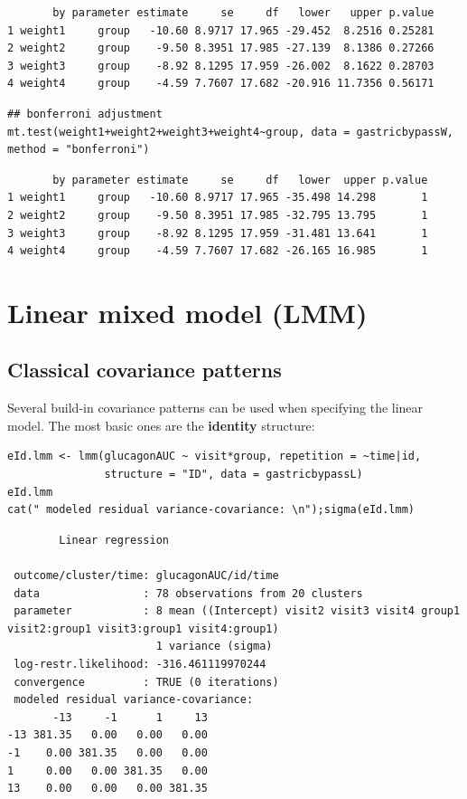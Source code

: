 \documentclass[12pt]{article}
\begin{document}
\begin{verbatim}
       by parameter estimate     se     df   lower   upper p.value
1 weight1     group   -10.60 8.9717 17.965 -29.452  8.2516 0.25281
2 weight2     group    -9.50 8.3951 17.985 -27.139  8.1386 0.27266
3 weight3     group    -8.92 8.1295 17.959 -26.002  8.1622 0.28703
4 weight4     group    -4.59 7.7607 17.682 -20.916 11.7356 0.56171
\end{verbatim}


\lstset{language=r,label= ,caption= ,captionpos=b,numbers=none}
\begin{lstlisting}
## bonferroni adjustment
mt.test(weight1+weight2+weight3+weight4~group, data = gastricbypassW, method = "bonferroni")
\end{lstlisting}

\begin{verbatim}
       by parameter estimate     se     df   lower  upper p.value
1 weight1     group   -10.60 8.9717 17.965 -35.498 14.298       1
2 weight2     group    -9.50 8.3951 17.985 -32.795 13.795       1
3 weight3     group    -8.92 8.1295 17.959 -31.481 13.641       1
4 weight4     group    -4.59 7.7607 17.682 -26.165 16.985       1
\end{verbatim}



\clearpage

\section{Linear mixed model (LMM)}
\label{sec:org2d295af}
\subsection{Classical covariance patterns}
\label{sec:org89dfa00}

Several build-in covariance patterns can be used when specifying the
linear model. The most basic ones are the \textbf{identity} structure:
\lstset{language=r,label= ,caption= ,captionpos=b,numbers=none}
\begin{lstlisting}
eId.lmm <- lmm(glucagonAUC ~ visit*group, repetition = ~time|id, 
               structure = "ID", data = gastricbypassL)
eId.lmm
cat(" modeled residual variance-covariance: \n");sigma(eId.lmm)
\end{lstlisting}

\begin{verbatim}
		Linear regression 

 outcome/cluster/time: glucagonAUC/id/time 
 data                : 78 observations from 20 clusters 
 parameter           : 8 mean ((Intercept) visit2 visit3 visit4 group1 visit2:group1 visit3:group1 visit4:group1) 
                       1 variance (sigma) 
 log-restr.likelihood: -316.461119970244 
 convergence         : TRUE (0 iterations)
 modeled residual variance-covariance: 
       -13     -1      1     13
-13 381.35   0.00   0.00   0.00
-1    0.00 381.35   0.00   0.00
1     0.00   0.00 381.35   0.00
13    0.00   0.00   0.00 381.35
\end{verbatim}
\end{document}
